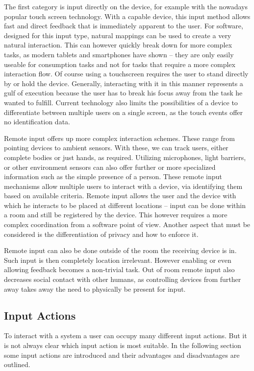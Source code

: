 \documentclass{acm_proc_article-sp}
\begin{document}
The first category is input directly on the device, for example with the nowadays popular touch screen technology.
With a capable device, this input method allows fast and direct feedback that is immediately apparent to the user.
For software, designed for this input type, natural mappings can be used to create a very natural interaction.
This can however quickly break down for more complex tasks, as modern tablets and smartphones have shown – they are only easily useable for consumption tasks and not for tasks that require a more complex interaction flow.
Of course using a touchscreen requires the user to stand directly by or hold the device.
Generally, interacting with it in this manner represents a gulf of execution because the user has to break his focus away from the task he wanted to fulfill.
Current technology also limits the possibilities of a device to differentiate between multiple users on a single screen, as the touch events offer no identification data.

Remote input offers up more complex interaction schemes.
These range from pointing devices to ambient sensors.
With these, we can track users, either complete bodies or just hands, as required. Utilizing microphones, light barriers, or other environment sensors can also offer further or more specialized information such as the simple presence of a person.
These remote input mechanisms allow multiple users to interact with a device, via identifying them based on available criteria.
Remote input allows the user and the device with which he interacts to be placed at different locations – input can be done within a room and still be registered by the device.
This however requires a more complex coordination from a software point of view.
Another aspect that must be considered is the differentiation of privacy and how to enforce it.

Remote input can also be done outside of the room the receiving device is in.
Such input is then completely location irrelevant.
However enabling or even allowing feedback becomes a non-trivial task.
Out of room remote input also decreases social contact with other humans, as controlling devices from further away takes away the need to physically be present for input.

\subsection{Input Actions}

To interact with a system a user can occupy many different input actions.
But it is not always clear which input action is most suitable.
In the following section some input actions are introduced and their advantages and disadvantages are outlined.
\end{document}
